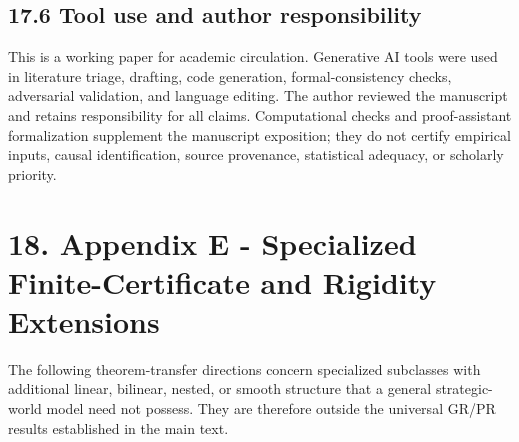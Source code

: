 \documentclass[10pt]{article}
\begin{document}
\subsection{17.6 Tool use and author responsibility}\label{tool-use-disclosure}

This is a working paper for academic circulation. Generative AI tools were used in literature triage, drafting, code generation, formal-consistency checks, adversarial validation, and language editing. The author reviewed the manuscript and retains responsibility for all claims. Computational checks and proof-assistant formalization supplement the manuscript exposition; they do not certify empirical inputs, causal identification, source provenance, statistical adequacy, or scholarly priority.

\section{18. Appendix E - Specialized Finite-Certificate and Rigidity Extensions}\label{appendix-e-specialized-extensions}

The following theorem-transfer directions concern specialized subclasses with additional linear, bilinear, nested, or smooth structure that a general strategic-world model need not possess. They are therefore outside the universal GR/PR results established in the main text.
\end{document}
